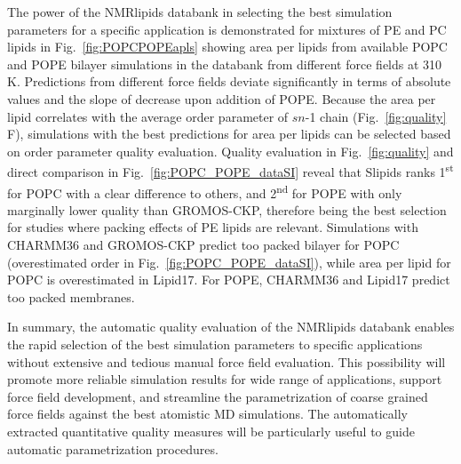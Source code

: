 \documentclass[fleqn,10pt]{wlscirep}
\begin{document}
The power of the NMRlipids databank in selecting the best simulation parameters for a specific application is demonstrated for mixtures of PE and PC lipids in Fig.~\ref{fig:POPCPOPEapls} showing area per lipids from available POPC and POPE bilayer simulations in the databank from different force fields at 310\,K. Predictions from different force fields deviate significantly in terms of absolute values and the slope of decrease upon addition of POPE. Because the area per lipid correlates with the average order parameter of $\textit{sn}$-1 chain (Fig.~\ref{fig:quality} F), simulations with the best predictions for area per lipids can be selected based on order parameter quality evaluation. Quality evaluation in Fig.~\ref{fig:quality} and direct comparison in Fig.~\ref{fig:POPC_POPE_dataSI} reveal that Slipids ranks 1\textsuperscript{st} for POPC with a clear difference to others, and 2\textsuperscript{nd} for POPE with only marginally lower quality than GROMOS-CKP, therefore being the best selection for studies where packing effects of PE lipids are relevant. 
Simulations with CHARMM36 and GROMOS-CKP predict too packed bilayer for POPC (overestimated order in Fig.~\ref{fig:POPC_POPE_dataSI}), while area per lipid for POPC is overestimated in Lipid17. For POPE, 
CHARMM36 and Lipid17 predict too packed membranes. 


In summary, 
the automatic quality evaluation of the NMRlipids databank enables the rapid selection of the best simulation parameters to specific applications without extensive and tedious manual force field evaluation. This possibility will promote more reliable simulation results for wide range of applications, support force field development, and streamline the parametrization of coarse grained force fields against the best atomistic MD simulations. The automatically extracted quantitative quality measures will be particularly useful to guide automatic parametrization procedures.
\end{document}
